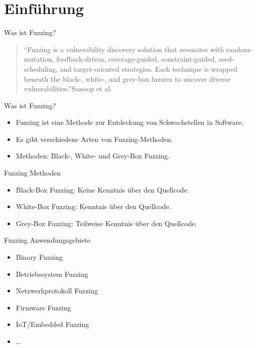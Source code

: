 
\section{Einführung}\label{sec:einfuhrung}
\begin{frame}{Was ist Fuzzing?}
    \blockquote{\enquote{Fuzzing is a vulnerability discovery solution that resonates with random-mutation, feedback-driven,
        coverage-guided, constraint-guided, seed-scheduling, and target-oriented strategies.
        Each technique is wrapped beneath the black-, white-, and grey-box fuzzers to uncover diverse vulnerabilities.}Sanoop et al.~\cite{fuzzing_methods}}
\end{frame}
\begin{frame}{Was ist Fuzzing?}
    \begin{itemize}
        \item Fuzzing ist eine Methode zur Entdeckung von Schwachstellen in Software.
        \item Es gibt verschiedene Arten von Fuzzing-Methoden.
        \item Methoden: Black-, White- und Grey-Box Fuzzing.
    \end{itemize}
\end{frame}
\begin{frame}{Fuzzing Methoden}
    \begin{itemize}
        \item Black-Box Fuzzing: Keine Kenntnis über den Quellcode.
        \item White-Box Fuzzing: Kenntnis über den Quellcode.
        \item Grey-Box Fuzzing: Teilweise Kenntnis über den Quellcode.
    \end{itemize}
\end{frame}
\begin{frame}{Fuzzing Anwendungsgebiete}
    \begin{itemize}
        \item Binary Fuzzing
        \item Betriebssystem Fuzzing
        \item Netzwerkprotokoll Fuzzing
        \item Firmware Fuzzing
        \item IoT/Embedded Fuzzing
        \item \ldots
    \end{itemize}
\end{frame}
